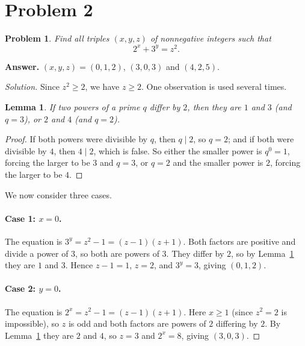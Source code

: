 \documentclass[11pt]{article}
\theoremstyle{problemstyle}
\newtheorem{problem}{Problem}
\theoremstyle{plain}
\newtheorem{lemma}{Lemma}
\newenvironment{solution}{\begin{proof}[Solution]}{\end{proof}}
\begin{document}
\section*{Problem 2}

\begin{problem}
Find all triples $(x, y, z)$ of nonnegative integers such that
\[
  2^x + 3^y = z^2.
\]
\end{problem}

\noindent\textbf{Answer.} $(x, y, z) = (0, 1, 2)$, $(3, 0, 3)$ and $(4, 2, 5)$.

\begin{solution}
Since $z^2 \ge 2$, we have $z \ge 2$. One observation is used several times.

\begin{lemma}\label{lem:gap}
If two powers of a prime $q$ differ by $2$, then they are $1$ and $3$ (and $q = 3$), or $2$ and $4$ (and $q = 2$).
\end{lemma}

\begin{proof}
If both powers were divisible by $q$, then $q \mid 2$, so $q = 2$; and if both were divisible by $4$, then $4 \mid 2$, which is false. So either the smaller power is $q^0 = 1$, forcing the larger to be $3$ and $q = 3$, or $q = 2$ and the smaller power is $2$, forcing the larger to be $4$.
\end{proof}

We now consider three cases.

\paragraph{Case 1: $x = 0$.} The equation is $3^y = z^2 - 1 = (z - 1)(z + 1)$. Both factors are positive and divide a power of $3$, so both are powers of $3$. They differ by $2$, so by Lemma~\ref{lem:gap} they are $1$ and $3$. Hence $z - 1 = 1$, $z = 2$, and $3^y = 3$, giving $(0, 1, 2)$.

\paragraph{Case 2: $y = 0$.} The equation is $2^x = z^2 - 1 = (z - 1)(z + 1)$. Here $x \ge 1$ (since $z^2 = 2$ is impossible), so $z$ is odd and both factors are powers of $2$ differing by $2$. By Lemma~\ref{lem:gap} they are $2$ and $4$, so $z = 3$ and $2^x = 8$, giving $(3, 0, 3)$.


\end{solution}
\end{document}
